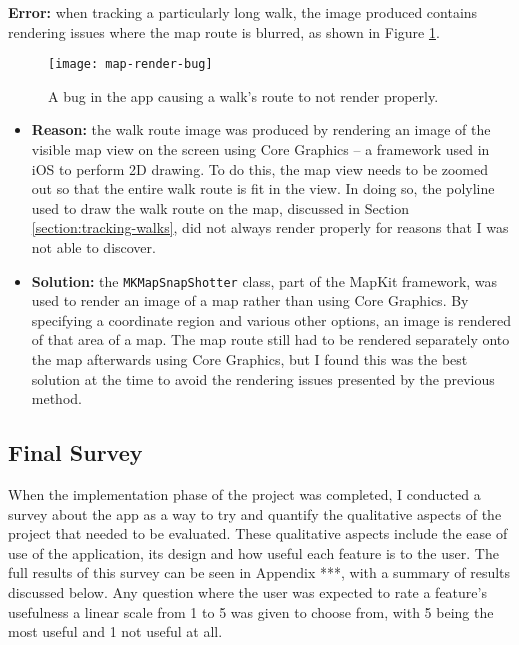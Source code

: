 \noindent \textbf{Error:} when tracking a particularly long walk, the image produced contains rendering issues where the map route is blurred, as shown in Figure \ref{fig:map-render-bug}.

\begin{figure}[hbt]
  \centering
  \texttt{[image: map-render-bug]}
  \caption{A bug in the app causing a walk's route to not render properly.}
  \label{fig:map-render-bug}
\end{figure}


\begin{itemize}
  \item \textbf{Reason:} the walk route image was produced by rendering an image of the visible map view on the screen using Core Graphics -- a framework used in iOS to perform 2D drawing. To do this, the map view needs to be zoomed out so that the entire walk route is fit in the view. In doing so, the polyline used to draw the walk route on the map, discussed in Section \ref{section:tracking-walks}, did not always render properly for reasons that I was not able to discover.
  
  \item \textbf{Solution:} the \verb|MKMapSnapShotter| class, part of the MapKit framework, was used to render an image of a map rather than using Core Graphics. By specifying a coordinate region and various other options, an image is rendered of that area of a map. The map route still had to be rendered separately onto the map afterwards using Core Graphics, but I found this was the best solution at the time to avoid the rendering issues presented by the previous method.
\end{itemize}

\subsection{Final Survey}


When the implementation phase of the project was completed, I conducted a survey about the app as a way to try and quantify the qualitative aspects of the project that needed to be evaluated. These qualitative aspects include the ease of use of the application, its design and how useful each feature is to the user. The full results of this survey can be seen in Appendix ***, with a summary of results discussed below. Any question where the user was expected to rate a feature's usefulness a linear scale from 1 to 5 was given to choose from, with 5 being the most useful and 1 not useful at all.


